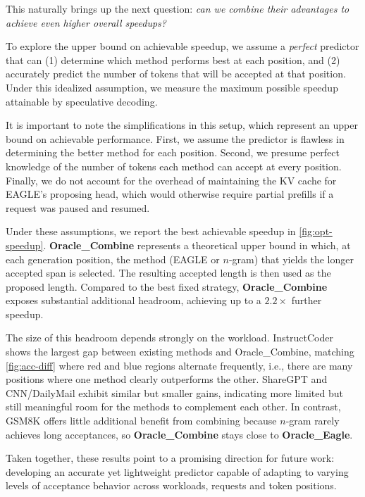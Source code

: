 \documentclass{article}
\begin{document}
This naturally brings up the next question: \emph{can we combine their advantages to achieve even higher overall speedups?}

To explore the upper bound on achievable speedup, we assume a \emph{perfect} predictor that can (1) determine which method performs best at each position, and (2) accurately predict the number of tokens that will be accepted at that position. Under this idealized assumption, we measure the maximum possible speedup attainable by speculative decoding.

It is important to note the simplifications in this setup, which represent an upper bound on achievable performance. First, we assume the predictor is flawless in determining the better method for each position. Second, we presume perfect knowledge of the number of tokens each method can accept at every position. 
Finally, we do not account for the overhead of maintaining the KV cache for EAGLE's proposing head, which would otherwise require partial prefills if a request was paused and resumed.


Under these assumptions, we report the best achievable speedup in \autoref{fig:opt-speedup}. \textbf{Oracle\_Combine} represents a theoretical upper bound in which, at each generation position, the method (EAGLE or $n$-gram) that yields the longer accepted span is selected. The resulting accepted length is then used as the proposed length. Compared to the best fixed strategy, \textbf{Oracle\_Combine} exposes substantial additional headroom, achieving up to a $2.2\times$ further speedup.

The size of this headroom depends strongly on the workload. InstructCoder shows the largest gap between existing methods and Oracle\_Combine, matching \autoref{fig:acc-diff} where red and blue regions alternate frequently, i.e., there are many positions where one method clearly outperforms the other. ShareGPT and CNN/DailyMail exhibit similar but smaller gains, indicating more limited but still meaningful room for the methods to complement each other. In contrast, GSM8K offers little additional benefit from combining because $n$-gram rarely achieves long acceptances, so \textbf{Oracle\_Combine} stays close to \textbf{Oracle\_Eagle}. 

Taken together, these results point to a promising direction for future work: developing an accurate yet lightweight predictor capable of adapting to varying levels of acceptance behavior across workloads, requests and token positions.
\end{document}
